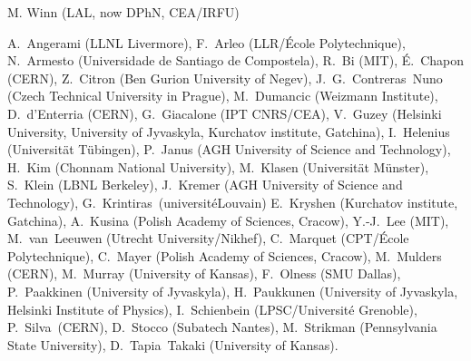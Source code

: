 { \small
{} M. Winn (LAL, now DPhN, CEA/IRFU) %

 A.~Angerami (LLNL Livermore), %
 F.~Arleo (LLR/{\'E}cole Polytechnique), %
 N.~Armesto (Universidade de Santiago de Compostela), %
 R.~Bi (MIT), %
 {\'E}.~Chapon (CERN), %
 Z.~Citron (Ben Gurion University of Negev), %
 J.~G.~Contreras~Nuno (Czech Technical University in Prague),  %
 M.~Dumancic (Weizmann Institute),
 D.~d'Enterria (CERN), %
 G.~Giacalone (IPT CNRS/CEA), %
 V.~Guzey (Helsinki University, University of Jyvaskyla, Kurchatov institute, Gatchina),  %
 I.~Helenius (Universit\"{a}t T\"{u}bingen), %
P.~Janus (AGH University of Science and Technology),
H.~Kim (Chonnam National University), 
M.~Klasen (Universit\"{a}t M\"{u}nster), %
S.~Klein (LBNL Berkeley), %
J.~Kremer (AGH University of Science and Technology),
G.~Krintiras~(universit\'{e}Louvain)
 E.~Kryshen (Kurchatov institute, Gatchina), %
 A.~Kusina (Polish Academy of Sciences, Cracow), %
 Y.-J.~Lee (MIT), %
 M.~van~Leeuwen (Utrecht University/Nikhef), %
 C.~Marquet (CPT/{\'E}cole Polytechnique), %
 C.~Mayer  (Polish Academy of Sciences, Cracow), %
 M.~Mulders (CERN),
 M.~Murray (University of Kansas), %
 F.~Olness (SMU Dallas), %
 P.~Paakkinen (University of Jyvaskyla), %
 H.~Paukkunen (University of Jyvaskyla, Helsinki Institute of Physics), %
 I.~Schienbein (LPSC/Universit{\'e} Grenoble),
 P.~Silva~(CERN),
 D.~Stocco (Subatech Nantes), %
 M.~Strikman (Pennsylvania State University), %
 D.~Tapia~Takaki (University of Kansas). %
}

